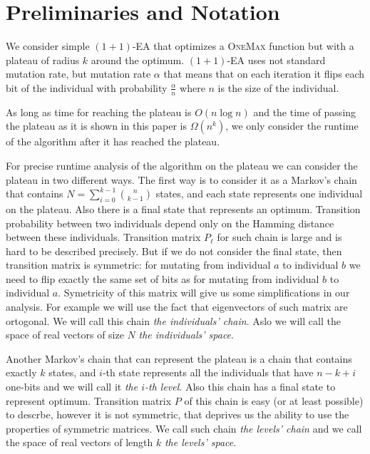 \documentclass{article}
\newcommand{\OM}{\textsc{OneMax}\xspace}
\begin{document}
\section{Preliminaries and Notation}

We consider simple $(1 + 1)$-EA that optimizes a \OM function but with a plateau of radius $k$ around the optimum. $(1 + 1)$-EA uses not standard mutation rate, but mutation rate $\alpha$ that means that on each iteration it flips each bit of the individual with probability $\frac{\alpha}{n}$ where $n$ is the size of the individual.

As long as time for reaching the plateau is $O(n\log n)$ and the time of passing the plateau as it is shown in this paper is $\Omega(n^k)$, we only consider the runtime of the algorithm after it has reached the plateau.

For precise runtime analysis of the algorithm on the plateau we can consider the plateau in two different ways. The first way is to consider it as a Markov's chain that contains $N = \sum\limits_{i = 0}^{k - 1} \binom{n}{k - 1}$ states, and each state represents one individual on the plateau. Also there is a final state that represents an optimum. Transition probability between two individuals depend only on the Hamming distance between these individuals. Transition matrix $P_\ell$ for such chain is large and is hard to be described precisely. But if we do not consider the final state, then transition matrix is symmetric: for mutating from individual $a$ to individual $b$ we need to flip exactly the same set of bits as for mutating from individual $b$ to individual $a$. Symetricity of this matrix will give us some simplifications in our analysis. For example we will use the fact that eigenvectors of such matrix are ortogonal. We will call this chain \textit{the individuals' chain}. Aslo we will call the space of real vectors of size $N$ \textit{the individuals' space}.

Another Markov's chain that can represent the plateau is a chain that contains exactly $k$ states, and $i$-th state represents all the individuals that have $n - k + i$ one-bits and we will call it \textit{the $i$-th level}. Also this chain has a final state to represent optimum. Transition matrix $P$ of this chain is easy (or at least possible) to descrbe, however it is not symmetric, that deprives us the ability to use the properties of symmetric matrices. We call such chain \textit{the levels' chain} and we call the space of real vectors of length $k$ \textit{the levels' space}.
\end{document}
